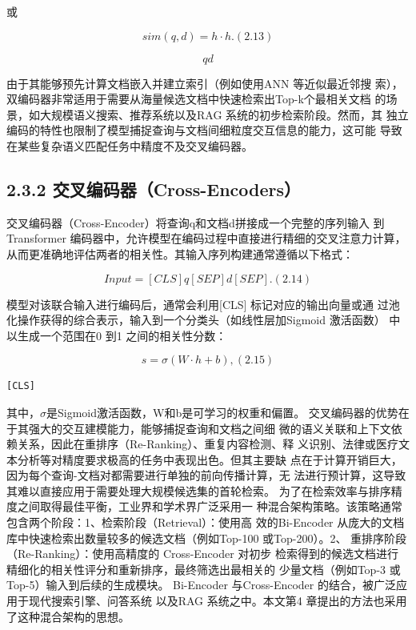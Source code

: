 \documentclass[12pt,a4paper,openright,UTF8]{ctexbook}
\begin{document}
或

\begin{equation*}
sim(q, d) = h\cdot h.(2.13)
\end{equation*}

\begin{equation*}
qd
\end{equation*}

由于其能够预先计算文档嵌入并建立索引（例如使用ANN 等近似最近邻搜 索），双编码器非常适用于需要从海量候选文档中快速检索出Top-k个最相关文档 的场景，如大规模语义搜索、推荐系统以及RAG 系统的初步检索阶段。然而，其 独立编码的特性也限制了模型捕捉查询与文档间细粒度交互信息的能力，这可能 导致在某些复杂语义匹配任务中精度不及交叉编码器。

\subsection{2.3.2 交叉编码器（Cross-Encoders）}

交叉编码器（Cross-Encoder）将查询q和文档d拼接成一个完整的序列输入 到Transformer 编码器中，允许模型在编码过程中直接进行精细的交叉注意力计算， 从而更准确地评估两者的相关性。其输入序列构建通常遵循以下格式：

\begin{equation*}
Input = [CLS] q[SEP] d[SEP].(2.14)
\end{equation*}

模型对该联合输入进行编码后，通常会利用[CLS] 标记对应的输出向量或通 过池化操作获得的综合表示，输入到一个分类头（如线性层加Sigmoid 激活函数） 中以生成一个范围在0 到1 之间的相关性分数：

\begin{equation*}
s= \sigma(W\cdot h + b) ,(2.15)
\end{equation*}

\begin{lstlisting}
[CLS]
\end{lstlisting}
其中，$\sigma$是Sigmoid激活函数，W和b是可学习的权重和偏置。 交叉编码器的优势在于其强大的交互建模能力，能够捕捉查询和文档之间细 微的语义关联和上下文依赖关系，因此在重排序（Re-Ranking）、重复内容检测、释 义识别、法律或医疗文本分析等对精度要求极高的任务中表现出色。但其主要缺 点在于计算开销巨大，因为每个查询-文档对都需要进行单独的前向传播计算，无 法进行预计算，这导致其难以直接应用于需要处理大规模候选集的首轮检索。 为了在检索效率与排序精度之间取得最佳平衡，工业界和学术界广泛采用一 种混合架构策略。该策略通常包含两个阶段：1、检索阶段（Retrieval）：使用高 效的Bi-Encoder 从庞大的文档库中快速检索出数量较多的候选文档（例如Top-100 或Top-200）。2、 重排序阶段（Re-Ranking）：使用高精度的 Cross-Encoder 对初步 检索得到的候选文档进行精细化的相关性评分和重新排序，最终筛选出最相关的 少量文档（例如Top-3 或Top-5）输入到后续的生成模块。 Bi-Encoder 与Cross-Encoder 的结合，被广泛应用于现代搜索引擎、问答系统 以及RAG 系统之中。本文第4 章提出的方法也采用了这种混合架构的思想。
\end{document}
